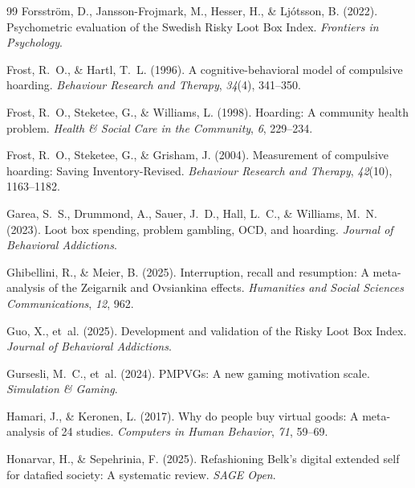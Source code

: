 \documentclass[12pt]{article}
\begin{document}
\begin{thebibliography}{99}
Forsstr\"{o}m, D., Jansson-Frojmark, M., Hesser, H., \& Lj\'{o}tsson, B. (2022).
\newblock Psychometric evaluation of the Swedish Risky Loot Box Index.
\newblock \textit{Frontiers in Psychology}.

Frost, R.~O., \& Hartl, T.~L. (1996).
\newblock A cognitive-behavioral model of compulsive hoarding.
\newblock \textit{Behaviour Research and Therapy}, \textit{34}(4), 341--350.

Frost, R.~O., Steketee, G., \& Williams, L. (1998).
\newblock Hoarding: A community health problem.
\newblock \textit{Health \& Social Care in the Community}, \textit{6}, 229--234.

Frost, R.~O., Steketee, G., \& Grisham, J. (2004).
\newblock Measurement of compulsive hoarding: Saving Inventory-Revised.
\newblock \textit{Behaviour Research and Therapy}, \textit{42}(10), 1163--1182.

Garea, S.~S., Drummond, A., Sauer, J.~D., Hall, L.~C., \& Williams, M.~N. (2023).
\newblock Loot box spending, problem gambling, OCD, and hoarding.
\newblock \textit{Journal of Behavioral Addictions}.

Ghibellini, R., \& Meier, B. (2025).
\newblock Interruption, recall and resumption: A meta-analysis of the Zeigarnik and Ovsiankina effects.
\newblock \textit{Humanities and Social Sciences Communications}, \textit{12}, 962.

Guo, X., et~al. (2025).
\newblock Development and validation of the Risky Loot Box Index.
\newblock \textit{Journal of Behavioral Addictions}.

Gursesli, M.~C., et~al. (2024).
\newblock PMPVGs: A new gaming motivation scale.
\newblock \textit{Simulation \& Gaming}.

Hamari, J., \& Keronen, L. (2017).
\newblock Why do people buy virtual goods: A meta-analysis of 24 studies.
\newblock \textit{Computers in Human Behavior}, \textit{71}, 59--69.

Honarvar, H., \& Sepehrinia, F. (2025).
\newblock Refashioning Belk's digital extended self for datafied society: A systematic review.
\newblock \textit{SAGE Open}.


\end{thebibliography}
\end{document}
